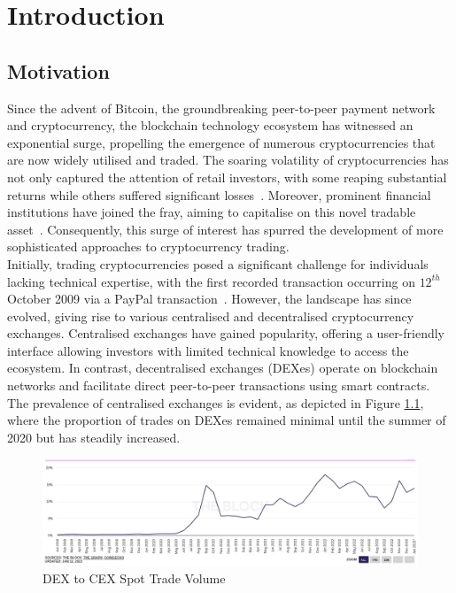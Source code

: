 \chapter{Introduction}
\section{Motivation}
Since the advent of Bitcoin, the groundbreaking peer-to-peer payment network and cryptocurrency, the blockchain technology ecosystem has witnessed an exponential surge, propelling the emergence of numerous cryptocurrencies that are now widely utilised and traded. The soaring volatility of cryptocurrencies has not only captured the attention of retail investors, with some reaping substantial returns while others suffered significant losses~\cite{losing_money_on_crypto_2021}. Moreover, prominent financial institutions have joined the fray, aiming to capitalise on this novel tradable asset~\cite{gondek_what_nodate}. Consequently, this surge of interest has spurred the development of more sophisticated approaches to cryptocurrency trading.
\\[3mm]
Initially, trading cryptocurrencies posed a significant challenge for individuals lacking technical expertise, with the first recorded transaction occurring on $12^{th}$ October 2009 via a PayPal transaction~\cite{noauthor_history_nodate}. However, the landscape has since evolved, giving rise to various centralised and decentralised cryptocurrency exchanges. Centralised exchanges have gained popularity, offering a user-friendly interface allowing investors with limited technical knowledge to access the ecosystem. In contrast, decentralised exchanges (DEXes) operate on blockchain networks and facilitate direct peer-to-peer transactions using smart contracts. The prevalence of centralised exchanges is evident, as depicted in Figure \ref{fig:dex_to_cex}, where the proportion of trades on DEXes remained minimal until the summer of 2020 but has steadily increased.
\vspace{-.2cm}
\begin{figure}[htb!]
    \centering
    \includegraphics[width=\textwidth]{introduction/Images/dex_to_cex.png}
    \caption{{DEX} to {CEX} {Spot} {Trade} {Volume}~\cite{dex_to_cex}}
    \label{fig:dex_to_cex}
\end{figure}
\vspace{-1cm}
